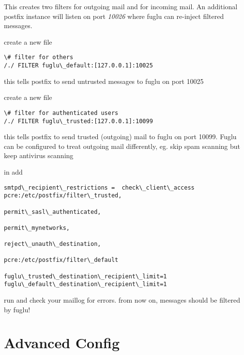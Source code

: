 \documentclass[letterpaper,10pt,english]{sphinxmanual}
\begin{document}
This creates two filters  for outgoing mail and  for incoming mail. An additional postfix instance will listen on port \emph{10026} where fuglu can re-inject filtered messages.

create a new file 

\begin{Verbatim}[commandchars=\\\{\}]
\# filter for others
/./ FILTER fuglu\_default:[127.0.0.1]:10025
\end{Verbatim}

this tells postfix to send untrusted messages to fuglu on port 10025

create a new file 

\begin{Verbatim}[commandchars=\\\{\}]
\# filter for authenticated users
/./ FILTER fuglu\_trusted:[127.0.0.1]:10099
\end{Verbatim}

this tells postfix to send trusted (outgoing) mail to fuglu on port 10099. Fuglu can be configured to treat outgoing mail differently, eg. skip spam scanning but keep antivirus scanning

in  add

\begin{Verbatim}[commandchars=\\\{\}]
smtpd\_recipient\_restrictions =  check\_client\_access pcre:/etc/postfix/filter\_trusted,
                                                                permit\_sasl\_authenticated,
                                                                permit\_mynetworks,
                                                                reject\_unauth\_destination,
                                                                pcre:/etc/postfix/filter\_default

fuglu\_trusted\_destination\_recipient\_limit=1
fuglu\_default\_destination\_recipient\_limit=1
\end{Verbatim}

run  and check your maillog for errors. from now on, messages should be filtered by fuglu!


\section{Advanced Config}
\label{configuration-index:advanced-config}
\end{document}
